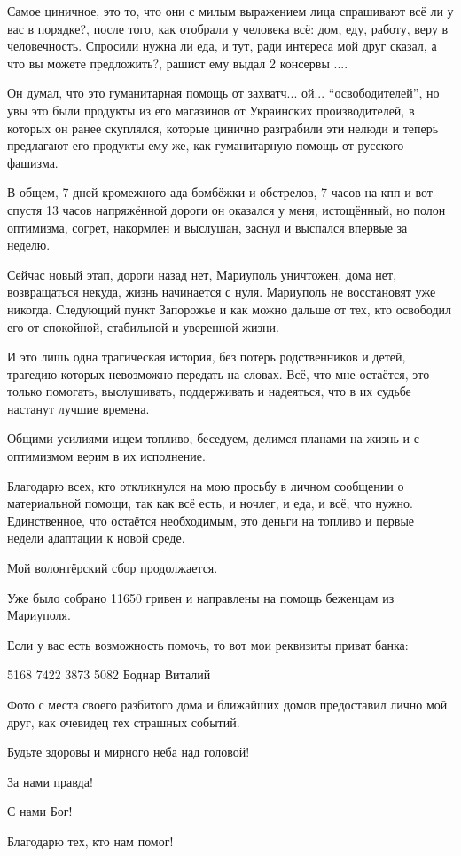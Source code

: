 Самое циничное, это то, что они с милым выражением лица спрашивают всё ли у вас
в порядке?, после того, как отобрали у человека всё: дом, еду, работу, веру в
человечность. Спросили нужна ли еда, и тут, ради интереса мой друг сказал, а
что вы можете предложить?, рашист ему выдал 2 консервы ....

Он думал, что это гуманитарная помощь от захватч... ой... \enquote{освободителей}, но
увы это были продукты из его магазинов от Украинских производителей, в которых
он ранее скуплялся, которые цинично разграбили эти нелюди и теперь предлагают
его продукты ему же, как гуманитарную помощь от русского фашизма. 

В общем, 7 дней кромежного ада бомбёжки и обстрелов, 7 часов на кпп и вот
спустя 13 часов напряжённой дороги он оказался у меня, истощённый, но полон
оптимизма, согрет, накормлен и выслушан, заснул и выспался впервые за неделю.

Сейчас новый этап, дороги назад нет, Мариуполь уничтожен, дома нет,
возвращаться некуда, жизнь начинается с нуля. Мариуполь не восстановят уже
никогда. Следующий пункт Запорожье и как можно дальше от тех, кто освободил его
от спокойной, стабильной и уверенной жизни.

И это лишь одна трагическая история, без потерь родственников и детей, трагедию
которых невозможно передать на словах. Всё, что мне остаётся, это только
помогать, выслушивать, поддерживать и надеяться, что в их судьбе настанут
лучшие времена. 

Общими усилиями ищем топливо, беседуем, делимся планами на жизнь и с оптимизмом
верим в их исполнение. 

Благодарю всех, кто откликнулся на мою просьбу в личном сообщении о
материальной помощи, так как всё есть, и ночлег, и еда, и всё, что нужно.
Единственное, что остаётся необходимым, это деньги на топливо и первые недели
адаптации к новой среде. 

Мой волонтёрский сбор продолжается.

Уже было собрано 11650 гривен и направлены на помощь беженцам из Мариуполя. 

Если у вас есть возможность помочь, то вот мои реквизиты приват банка:

5168 7422 3873 5082 Боднар Виталий 

Фото с места своего разбитого дома и ближайших домов предоставил лично мой
друг, как очевидец тех страшных событий. 

Будьте здоровы и мирного неба над головой! 

За нами правда!

С нами Бог!

Благодарю тех, кто нам помог!

